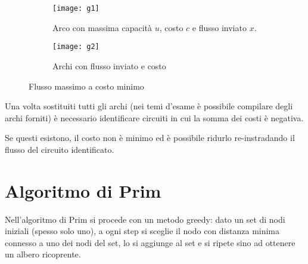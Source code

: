 \documentclass[\main/main.tex]{subfiles}
\begin{document}
\begin{figure}
  \begin{subfigure}{0.49\textwidth}
    \texttt{[image: g1]}
    \caption{Arco con massima capacità $u$, costo $c$ e flusso inviato $x$.}
  \end{subfigure}
  \begin{subfigure}{0.49\textwidth}
    \texttt{[image: g2]}
    \caption{Archi con flusso inviato e costo}
  \end{subfigure}
  \caption{Flusso massimo a costo minimo}
\end{figure}

Una volta sostituiti tutti gli archi (nei temi d'esame è possibile compilare degli archi forniti) è necessario identificare circuiti in cui la somma dei costi è negativa.

Se questi esistono, il costo non è minimo ed è possibile ridurlo re-instradando il flusso del circuito identificato.

\section{Algoritmo di Prim}
Nell'algoritmo di Prim si procede con un metodo greedy: dato un set di nodi iniziali (spesso solo uno), a ogni step si sceglie il nodo con distanza minima connesso a uno dei nodi del set, lo si aggiunge al set e si ripete sino ad ottenere un albero ricoprente.
\end{document}
